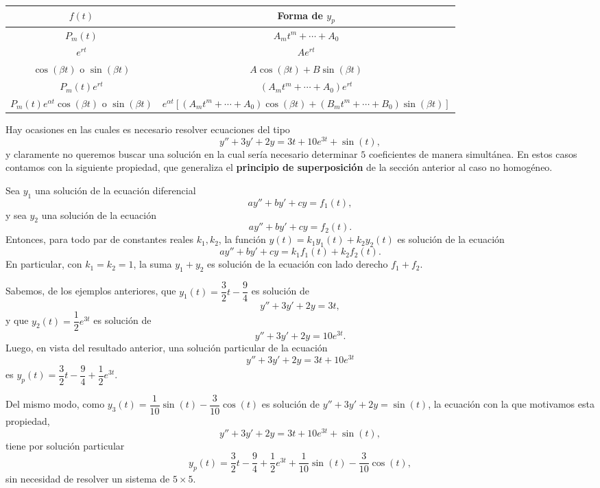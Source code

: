 \begin{center}
\small\renewcommand{\arraystretch}{1.6}
\begin{tabular}{|c|c|}
\hline
$f(t)$ & \textbf{Forma de} $y_p$ \\ \hline
$P_m(t)$ & $A_mt^m+\cdots+A_0$ \\ \hline
$e^{rt}$ & $Ae^{rt}$ \\ \hline
$\cos(\beta t)$ o $\sin(\beta t)$ & $A\cos(\beta t)+B\sin(\beta t)$ \\ \hline
$P_m(t)e^{rt}$ & $(A_mt^m+\cdots+A_0)e^{rt}$ \\ \hline
$P_m(t)e^{\alpha t}\cos(\beta t)$ o $\sin(\beta t)$ & $e^{\alpha t}\left[(A_mt^m+\cdots+A_0)\cos(\beta t)+(B_mt^m+\cdots+B_0)\sin(\beta t)\right]$ \\ \hline
\end{tabular}
\end{center}

Hay ocasiones en las cuales es necesario resolver ecuaciones del tipo
\[
y''+3y'+2y=3t+10e^{3t}+\sin(t),
\]
y claramente no queremos buscar una soluci\'on en la cual ser\'ia necesario determinar $5$ coeficientes de manera simult\'anea. En estos casos contamos con la siguiente propiedad, que generaliza el \textbf{principio de superposici\'on} de la secci\'on anterior al caso no homog\'eneo.

\begin{remark}
    Sea $y_1$ una soluci\'on de la ecuaci\'on diferencial
    \[
    ay''+by'+cy=f_1(t),
    \]
    y sea $y_2$ una soluci\'on de la ecuaci\'on
    \[
    ay''+by'+cy=f_2(t).
    \]
    Entonces, para todo par de constantes reales $k_1,k_2$, la funci\'on $y(t)=k_1y_1(t)+k_2y_2(t)$ es soluci\'on de la ecuaci\'on
    \[
    ay''+by'+cy=k_1f_1(t)+k_2f_2(t).
    \]
    En particular, con $k_1=k_2=1$, la suma $y_1+y_2$ es soluci\'on de la ecuaci\'on con lado derecho $f_1+f_2$.
\end{remark}

\begin{example}
    Sabemos, de los ejemplos anteriores, que $y_1(t)=\dfrac{3}{2}t-\dfrac{9}{4}$ es soluci\'on de
    \[
    y''+3y'+2y=3t,
    \]
    y que $y_2(t)=\dfrac{1}{2}e^{3t}$ es soluci\'on de
    \[
    y''+3y'+2y=10e^{3t}.
    \]
    Luego, en vista del resultado anterior, una soluci\'on particular de la ecuaci\'on
    \[
    y''+3y'+2y=3t+10e^{3t}
    \]
    es $y_p(t)=\dfrac{3}{2}t-\dfrac{9}{4}+\dfrac{1}{2}e^{3t}$.

    Del mismo modo, como $y_3(t)=\dfrac{1}{10}\sin(t)-\dfrac{3}{10}\cos(t)$ es soluci\'on de $y''+3y'+2y=\sin(t)$, la ecuaci\'on con la que motivamos esta propiedad,
    \[
    y''+3y'+2y=3t+10e^{3t}+\sin(t),
    \]
    tiene por soluci\'on particular
    \[
    y_p(t)=\dfrac{3}{2}t-\dfrac{9}{4}+\dfrac{1}{2}e^{3t}+\dfrac{1}{10}\sin(t)-\dfrac{3}{10}\cos(t),
    \]
    sin necesidad de resolver un sistema de $5\times 5$.
\end{example}

